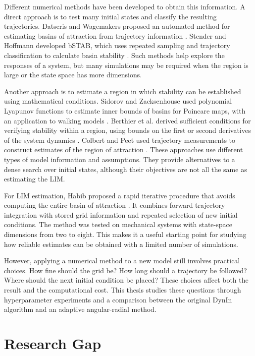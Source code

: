 Different numerical methods have been developed to obtain this information. A direct approach is to test many initial states and classify the resulting trajectories. Datseris and Wagemakers proposed an automated method for estimating basins of attraction from trajectory information \cite{ref7}. Stender and Hoffmann developed bSTAB, which uses repeated sampling and trajectory classification to calculate basin stability \cite{ref8}. Such methods help explore the responses of a system, but many simulations may be required when the region is large or the state space has more dimensions.

Another approach is to estimate a region in which stability can be established using mathematical conditions. Sidorov and Zacksenhouse used polynomial Lyapunov functions to estimate inner bounds of basins for Poincare maps, with an application to walking models \cite{ref9}. Berthier et al. derived sufficient conditions for verifying stability within a region, using bounds on the first or second derivatives of the system dynamics \cite{ref10}. Colbert and Peet used trajectory measurements to construct estimates of the region of attraction \cite{ref11}. These approaches use different types of model information and assumptions. They provide alternatives to a dense search over initial states, although their objectives are not all the same as estimating the LIM.

For LIM estimation, Habib proposed a rapid iterative procedure that avoids computing the entire basin of attraction \cite{ref12}. It combines forward trajectory integration with stored grid information and repeated selection of new initial conditions. The method was tested on mechanical systems with state-space dimensions from two to eight. This makes it a useful starting point for studying how reliable estimates can be obtained with a limited number of simulations.

\begin{revision}
However, applying a numerical method to a new model still involves practical choices. How fine should the grid be? How long should a trajectory be followed? Where should the next initial condition be placed? These choices affect both the result and the computational cost. This thesis studies these questions through hyperparameter experiments and a comparison between the original DynIn algorithm and an adaptive angular-radial method.
\end{revision}

\section{Research Gap}

